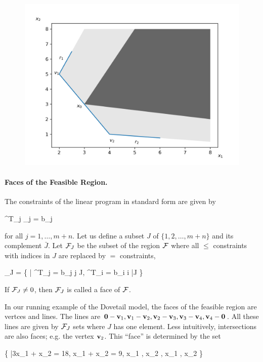 \begin{figure}[H]
\includegraphics[scale = 0.7]{images/2022-09-27_lin_prog_1_04.png}
\end{figure}


\paragraph{Faces of the Feasible Region.} The constraints of the linear program in standard form are given by

\bee
\abf^T_j \xbf_j = b_j
\eee

for all $j = 1, \ldots, m+n$. Let us define a subset $J$ of $\{1,2,\ldots, m+n\}$ and its complement $\bar{J}$. Let $\mathcal{F}_J$ be the subset of the region $\mathcal{F}$ where all $\leq$ constraints with indices in $J$ are replaced by $=$ constraints,

\bee
\Fc_J = \{ \xbf \in \mR | \abf^T_j \xbf = b_j \forall  j \in J, \abf^T_i \xbf = b_i \forall  i \in \bar{J} \}
\eee

If $\mathcal{F}_J \neq 0$, then $\mathcal{F}_J$ is called a face of $\mathcal{F}$.

In our running example of the Dovetail model, the faces of the feasible region are vertces and lines. The lines are $\mathbf{0} - \mathbf{v}_1, \mathbf{v}_1 - \mathbf{v}_2, \mathbf{v}_2 - \mathbf{v}_3, \mathbf{v}_3 - \mathbf{v}_4, \mathbf{v}_4 - \mathbf{0}$. All these lines are given by $\mathcal{F}_J$ sets where $J$ has one element. Less intuitively, intersections are also faces; e.g. the vertex $\mathbf{v}_2$. This ``face'' is determined by the set

\bee
\{ \xbf \in \mR |3x_1 + x_2 = 18, x_1 + x_2 = 9, x_1 , x_2 , x_1 , x_2  \}
\eee

